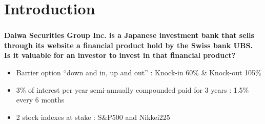 \section{Introduction}

\begin{frame}
\frametitle{\insertsection}
\textbf{Daiwa Securities Group Inc. is a Japanese investment bank that sells through its website a financial product hold by the Swiss bank UBS.
\\Is it valuable for an investor to invest in that financial product?}
\begin{itemize}
	\item Barrier option “down and in, up and out” : Knock-in 60\% \& Knock-out 105\%
	\item 3\% of interest per year semi-annually compounded paid for 3 years : 1.5\% every 6 months
	\item 2 stock indexes at stake : S\&P500 and Nikkei225
\end{itemize}
\end{frame}

